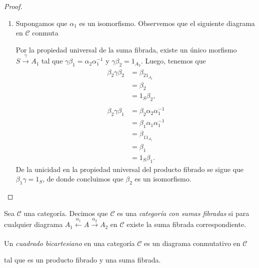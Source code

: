 \documentclass[tesis]{subfiles}
\begin{document}
\begin{proof}
\begin{enumerate}[label=(\alph*)]
        \item Supongamos que $\alpha_1$ es un isomorfismo. Observemos que el siguiente diagrama en $\mathscr{C}$ conmuta
    \begin{center}
    \end{center}
    Por la propiedad universal de la suma fibrada, existe un único morfismo $S\xrightarrow[]{\gamma} A_1$ tal que $\gamma\beta_1=\alpha_2\alpha_1^{-1}$ y $\gamma\beta_2=1_{A_2}$. Luego, tenemos que
    \begin{align*}
        \beta_2\gamma\beta_2 &= \beta_21_{A_2} \\
                             &= \beta_2 \\
                             &= 1_S\beta_2, \\ \\
        \beta_2\gamma\beta_1 &= \beta_2\alpha_2\alpha_1^{-1} \\
                             &= \beta_1\alpha_1\alpha_1^{-1} \\
                             &= \beta_11_{A_1} \\
                             &= \beta_1 \\
                             &= 1_S\beta_1.
    \end{align*}
    De la unicidad en la propiedad universal del producto fibrado se sigue que $\beta_1\gamma=1_S$, de donde concluimos que $\beta_2$ es un isomorfismo.

    \end{enumerate}
\end{proof}

\begin{Def}
    Sea $\mathscr{C}$ una categoría. Decimos que $\mathscr{C}$ es una \emph{categoría con sumas fibradas} si para cualquier diagrama $A_1\xleftarrow[]{\alpha_1}A\xrightarrow[]{\alpha_2}A_2$ en $\mathscr{C}$ existe la suma fibrada correspondiente.
\end{Def}

\begin{Def}
    Un \emph{cuadrado bicartesiano} en una categoría $\mathscr{C}$ es un diagrama conmutativo en $\mathscr{C}$
    \begin{center}
    \end{center}
    tal que es un producto fibrado y una suma fibrada.
\end{Def}
\end{document}
